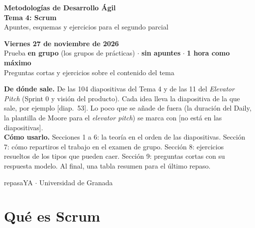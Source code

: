 \documentclass[11pt,a4paper,oneside,openany]{report}
\newcommand{\diap}[1]{\textcolor{mdaPrimary}{\small[diap.~#1]}}
\newcommand{\extra}{\textcolor{mdaOrange}{\small[no está en las diapositivas]}}
\begin{document}
\begin{titlepage}
  \centering
  \vspace*{1.2cm}
  {\Huge\bfseries\color{mdaDarkBlue}\textsf{Metodologías de Desarrollo Ágil}}\\[0.5cm]
  {\LARGE\bfseries\color{mdaPrimary}\textsf{Tema 4: Scrum}}\\[0.3cm]
  {\Large\textsf{Apuntes, esquemas y ejercicios para el segundo parcial}}\\[1.2cm]
  \begin{tcolorbox}[colback=mdaLightAccent,colframe=mdaAccent,width=0.88\textwidth,arc=4pt,halign=center]
    \large\textbf{Viernes 27 de noviembre de 2026}\\[4pt]
    \normalsize Prueba \textbf{en grupo} (los grupos de prácticas) $\cdot$ \textbf{sin apuntes} $\cdot$ \textbf{1 hora como máximo}\\[4pt]
    Preguntas cortas y ejercicios sobre el contenido del tema
  \end{tcolorbox}
  \vspace{0.8cm}
  \begin{minipage}{0.88\textwidth}\small
  \textbf{De dónde sale.} De las 104 diapositivas del Tema 4 y de las 11 del \emph{Elevator Pitch} (Sprint 0 y
  visión del producto). Cada idea lleva la diapositiva de la que sale, por ejemplo \diap{53}. Lo poco que se añade de
  fuera (la duración del Daily, la plantilla de Moore para el \emph{elevator pitch}) se marca con
  \extra.\\[6pt]
  \textbf{Cómo usarlo.} Secciones 1 a 6: la teoría en el orden de las diapositivas. Sección 7: cómo repartiros el
  trabajo en el examen de grupo. Sección 8: ejercicios resueltos de los tipos que pueden caer. Sección 9: preguntas
  cortas con su respuesta modelo. Al final, una tabla resumen para el último repaso.
  \end{minipage}
  \vfill
  {\large\textsf{repasaYA $\cdot$ Universidad de Granada}}
\end{titlepage}

\tableofcontents
\clearpage

\section{Qué es Scrum}
\end{document}
